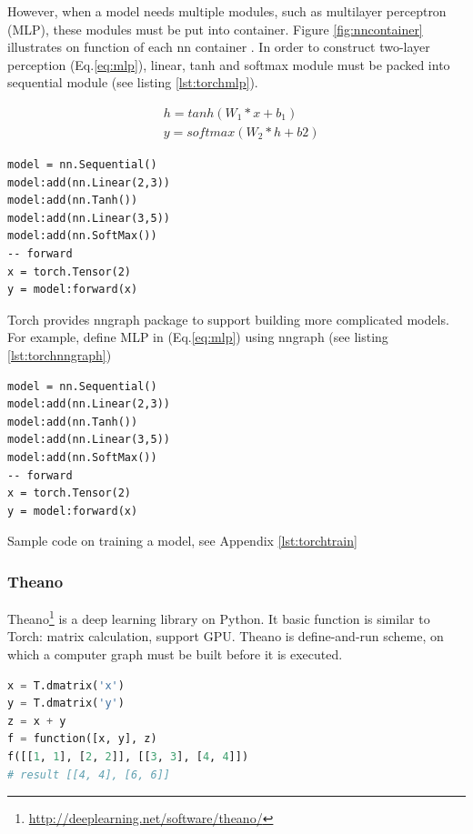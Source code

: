 However, when a model needs multiple modules, such as multilayer perceptron (MLP), these modules must be put into container. Figure \ref{fig:nncontainer} illustrates on function of each nn container . In order to construct two-layer perception (Eq.\ref{eq:mlp}), linear, tanh and softmax module must be packed into sequential module (see listing \ref{lst:torchmlp}).

\begin{equation}
\label{eq:mlp}
\begin{aligned}
&h = tanh(W_1*x + b_1) \\
&y = softmax(W_2*h + b2)
\end{aligned}
\end{equation}


\begin{lstlisting}[caption={MLP in Torch},label={lst:torchmlp}, language={[5.1]Lua}]
model = nn.Sequential()
model:add(nn.Linear(2,3))
model:add(nn.Tanh())
model:add(nn.Linear(3,5))
model:add(nn.SoftMax())
-- forward
x = torch.Tensor(2)
y = model:forward(x)
\end{lstlisting}

Torch provides nngraph package to support building more complicated models. For example, define MLP in (Eq.\ref{eq:mlp}) using nngraph (see listing \ref{lst:torchnngraph})

\begin{lstlisting}[caption={MLP using nngraph},label={lst:torchnngraph}, language={[5.1]Lua}]
model = nn.Sequential()
model:add(nn.Linear(2,3))
model:add(nn.Tanh())
model:add(nn.Linear(3,5))
model:add(nn.SoftMax())
-- forward
x = torch.Tensor(2)
y = model:forward(x)
\end{lstlisting}

Sample code on training a model, see Appendix \ref{lst:torchtrain}

\subsubsection{Theano}
Theano\footnote{\url{http://deeplearning.net/software/theano/}} is a deep learning library on Python. It basic function is similar to Torch: matrix calculation, support GPU. Theano is define-and-run scheme, on which a computer graph must be built before it is executed.

\begin{lstlisting}[caption={Define function in Theano},label={lst:theanof}, language={python}]
x = T.dmatrix('x')
y = T.dmatrix('y')
z = x + y
f = function([x, y], z)
f([[1, 1], [2, 2]], [[3, 3], [4, 4]])
# result [[4, 4], [6, 6]]
\end{lstlisting}

